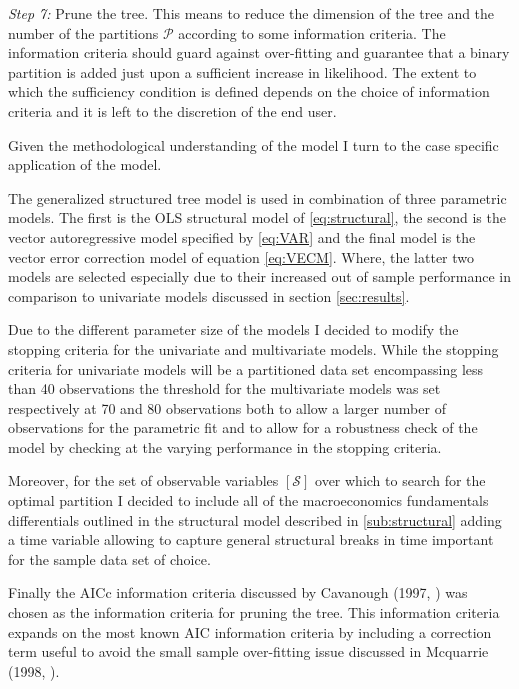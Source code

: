 \textit{Step 7:} Prune the tree. This means to reduce the dimension of
the tree and the number of the partitions $\mathcal{P}$ according to
some information criteria. The information criteria should guard
against over-fitting and guarantee that a binary partition is added
just upon a sufficient increase in likelihood. The extent to which the
sufficiency condition is defined depends on the choice of information
criteria and it is left to the discretion of the end user.\\

\setlength{\leftskip}{0pt}
\setlength{\rightskip}{0pt}

Given the methodological understanding of the model I turn to the case
specific application of the model.

The generalized structured tree model is used in combination of three
parametric models. The first is the OLS structural model of
\ref{eq:structural}, the second is the vector autoregressive model
specified by \ref{eq:VAR} and the final model is the vector error
correction model of equation \ref{eq:VECM}. Where, the latter two
models are selected especially due to their increased out of sample
performance in comparison to univariate models discussed in section
\ref{sec:results}.

Due to the different parameter size of the models I
decided to modify the stopping criteria for the univariate and
multivariate models. While the stopping criteria for univariate models
will be a partitioned data set encompassing less than 40 observations
the threshold for the multivariate models was set respectively at 70 and 80
observations both to allow a larger number of observations
for the parametric fit and to allow for a robustness check of the model
by checking at the varying performance in the stopping criteria.

Moreover, for the set of observable variables $[\mathcal{S}]$ over which to search for
the optimal partition I decided to include all of the macroeconomics
fundamentals differentials outlined in the structural model described
in \ref{sub:structural} adding a time variable allowing to
capture general structural breaks in time important for the
sample data set of choice.

Finally the AICc information criteria discussed by Cavanough (1997,
\cite{Cavanough}) was chosen as the information criteria for pruning
the tree. This information criteria expands on the most known AIC
information criteria by including a correction term useful to avoid the
small sample over-fitting issue discussed in Mcquarrie (1998,
\cite{Mcquarrie}).

